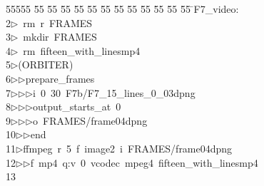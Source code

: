 %
%
\begin{tabbing}
55555 \= 55 \= 55 \= 55 \= 55 \= 55 \= 55 \= 55 \= 55 \= 55 \= 55 \= 55 \= 55 \= \>F7\_video:\\[0pt]
2\>$\triangleright$\>\ rm\ r\ FRAMES\\[0pt]
3\>$\triangleright$\>\ mkdir\ FRAMES\\[0pt]
4\>$\triangleright$\>\ rm\ fifteen\_with\_linesmp4\\[0pt]
5\>$\triangleright$\>(ORBITER)\ \\[0pt]
6\>$\triangleright$\>$\triangleright$\>prepare\_frames\ \\[0pt]
7\>$\triangleright$\>$\triangleright$\>$\triangleright$\>i\ 0\ 30\ F7b/F7\_15\_lines\_0\_03dpng\ \\[0pt]
8\>$\triangleright$\>$\triangleright$\>$\triangleright$\>output\_starts\_at\ 0\ \\[0pt]
9\>$\triangleright$\>$\triangleright$\>$\triangleright$\>o\ FRAMES/frame04dpng\ \\[0pt]
10\>$\triangleright$\>$\triangleright$\>end\\[0pt]
11\>$\triangleright$\>ffmpeg\ r\ 5\ f\ image2\ i\ FRAMES/frame04dpng\ \\[0pt]
12\>$\triangleright$\>$\triangleright$\>f\ mp4\ q:v\ 0\ vcodec\ mpeg4\ fifteen\_with\_linesmp4\\[0pt]
13\>\end{tabbing}
